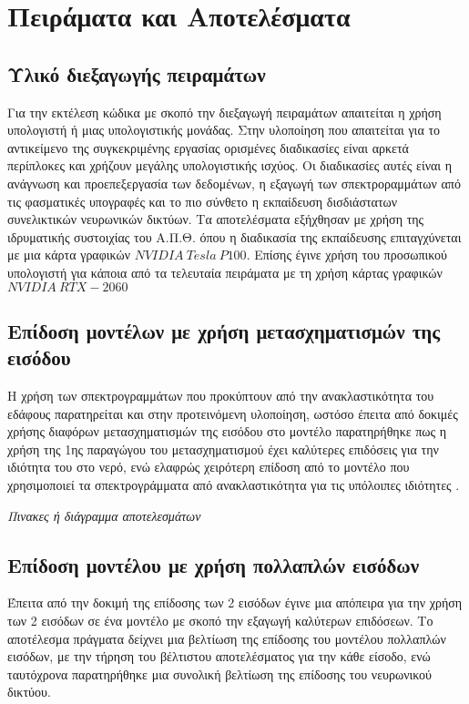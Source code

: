 \chapter{Πειράματα και Αποτελέσματα}
\label{ch:experiments_and_results}

\section{Υλικό διεξαγωγής πειραμάτων}
Για την εκτέλεση κώδικα με σκοπό την διεξαγωγή πειραμάτων απαιτείται η χρήση υπολογιστή ή μιας υπολογιστικής μονάδας. Στην υλοποίηση που απαιτείται για το αντικείμενο της συγκεκριμένης εργασίας ορισμένες διαδικασίες είναι αρκετά περίπλοκες και χρήζουν μεγάλης υπολογιστικής ισχύος. Οι διαδικασίες αυτές είναι η ανάγνωση και προεπεξεργασία των δεδομένων, η εξαγωγή των σπεκτροραμμάτων από τις φασματικές υπογραφές και το πιο σύνθετο η εκπαίδευση δισδιάστατων συνελικτικών νευρωνικών δικτύων.
Τα αποτελέσματα εξήχθησαν με χρήση της ιδρυματικής συστοιχίας του Α.Π.Θ. \cite{hpcauth} όπου η διαδικασία της εκπαίδευσης επιταγχύνεται με μια κάρτα γραφικών $NVIDIA~Tesla~P100$. Επίσης έγινε χρήση του προσωπικού υπολογιστή για κάποια από τα τελευταία πειράματα με τη χρήση κάρτας γραφικών $NVIDIA~RTX-2060$

\section{Επίδοση μοντέλων με χρήση μετασχηματισμών της εισόδου }
Η χρήση των σπεκτρογραμμάτων που προκύπτουν από την ανακλαστικότητα  του εδάφους παρατηρείται και στην προτεινόμενη υλοποίηση, ωστόσο έπειτα από δοκιμές χρήσης διαφόρων μετασχηματισμών της εισόδου στο μοντέλο παρατηρήθηκε πως η χρήση της 1ης παραγώγου του μετασχηματισμού  έχει καλύτερες επιδόσεις για την ιδιότητα του  στο νερό, ενώ ελαφρώς χειρότερη επίδοση από το μοντέλο που χρησιμοποιεί τα σπεκτρογράμματα από ανακλαστικότητα για τις υπόλοιπες ιδιότητες .

\textit{Πινακες ή διάγραμμα αποτελεσμάτων}

\section{Επίδοση μοντέλου με χρήση πολλαπλών εισόδων}
Έπειτα από την δοκιμή της επίδοσης των 2 εισόδων έγινε μια απόπειρα για την χρήση των 2 εισόδων σε ένα μοντέλο με σκοπό την εξαγωγή καλύτερων επιδόσεων. Το αποτέλεσμα πράγματα δείχνει μια βελτίωση της επίδοσης του μοντέλου πολλαπλών εισόδων, με την τήρηση του βέλτιστου αποτελέσματος για την κάθε είσοδο, ενώ ταυτόχρονα παρατηρήθηκε μια συνολική βελτίωση της επίδοσης του νευρωνικού δικτύου.

